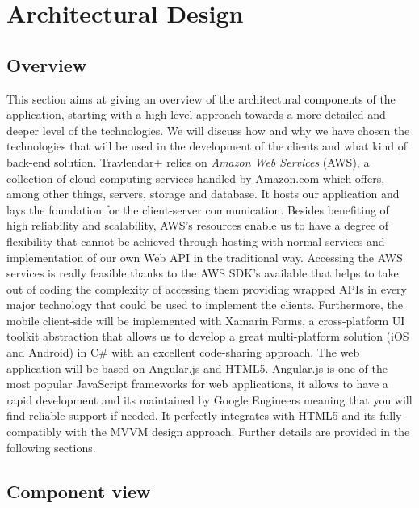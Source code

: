 \chapter{Architectural Design}
\label{cha:arch}

\section{Overview}
\label{sec:overview}
This section aims at giving an overview of the architectural components of the application, starting with a high-level approach towards a more detailed and deeper level of the technologies. We will discuss how and why we have chosen the technologies that will be used in the development of the clients and what kind of back-end solution.
\newline Travlendar+ relies on \textit{Amazon Web Services} (AWS), a collection of cloud computing services handled by Amazon.com which offers, among other things, servers, storage and database. It hosts our application and lays the foundation for the client-server communication. Besides benefiting of high reliability and scalability, AWS's resources enable us to have a degree of flexibility that cannot be achieved through hosting with normal services and implementation of our own Web API in the traditional way.
Accessing the AWS services is really feasible thanks to the AWS SDK's available that helps to take out of coding the complexity of accessing them providing wrapped APIs in every major technology that could be used to implement the clients.
Furthermore, the mobile client-side will be implemented with Xamarin.Forms, a cross-platform UI toolkit abstraction that allows us to develop a great multi-platform solution (iOS and Android) in C\# with an excellent code-sharing approach.
The web application will be based on Angular.js and HTML5.
Angular.js is one of the most popular JavaScript frameworks for web applications, it allows to have a rapid development and its maintained by Google Engineers meaning that you will find reliable support if needed. It perfectly integrates with HTML5 and its fully compatibly with the MVVM design approach. Further details are provided in the following sections.

\section{Component view}
\label{sec:comp_view}

